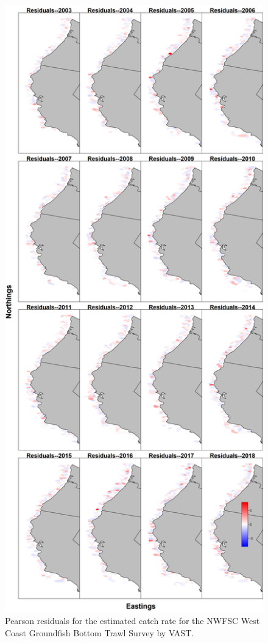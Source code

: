 \documentclass[12pt,]{article}
\begin{document}
\FloatBarrier

\begin{figure}
\centering
\includegraphics{Figures/nwfsc_maps--catchrate_pearson_resid.png}
\caption{Pearson residuals for the estimated catch rate for the NWFSC
West Coast Groundfish Bottom Trawl Survey by VAST.
\label{fig:nw_catch_rate}}
\end{figure}
\end{document}
